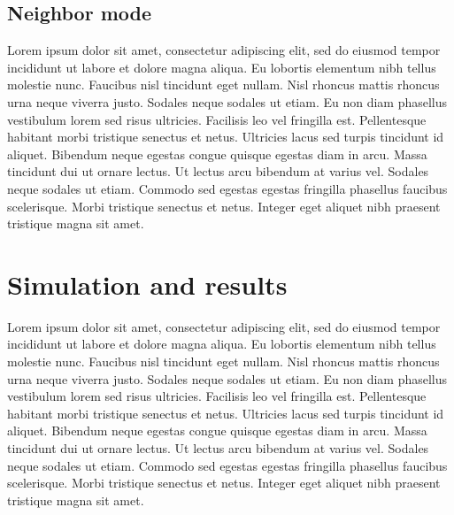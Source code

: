 \documentclass[]{article}
\begin{document}
\subsection{Neighbor mode}
Lorem ipsum dolor sit amet, consectetur adipiscing elit, sed do eiusmod tempor incididunt ut labore et dolore magna aliqua. Eu lobortis elementum nibh tellus molestie nunc. Faucibus nisl tincidunt eget nullam. Nisl rhoncus mattis rhoncus urna neque viverra justo. Sodales neque sodales ut etiam. Eu non diam phasellus vestibulum lorem sed risus ultricies. Facilisis leo vel fringilla est. Pellentesque habitant morbi tristique senectus et netus. Ultricies lacus sed turpis tincidunt id aliquet. Bibendum neque egestas congue quisque egestas diam in arcu. Massa tincidunt dui ut ornare lectus. Ut lectus arcu bibendum at varius vel. Sodales neque sodales ut etiam. Commodo sed egestas egestas fringilla phasellus faucibus scelerisque. Morbi tristique senectus et netus. Integer eget aliquet nibh praesent tristique magna sit amet.
\section{Simulation and results}
Lorem ipsum dolor sit amet, consectetur adipiscing elit, sed do eiusmod tempor incididunt ut labore et dolore magna aliqua. Eu lobortis elementum nibh tellus molestie nunc. Faucibus nisl tincidunt eget nullam. Nisl rhoncus mattis rhoncus urna neque viverra justo. Sodales neque sodales ut etiam. Eu non diam phasellus vestibulum lorem sed risus ultricies. Facilisis leo vel fringilla est. Pellentesque habitant morbi tristique senectus et netus. Ultricies lacus sed turpis tincidunt id aliquet. Bibendum neque egestas congue quisque egestas diam in arcu. Massa tincidunt dui ut ornare lectus. Ut lectus arcu bibendum at varius vel. Sodales neque sodales ut etiam. Commodo sed egestas egestas fringilla phasellus faucibus scelerisque. Morbi tristique senectus et netus. Integer eget aliquet nibh praesent tristique magna sit amet.
\end{document}
